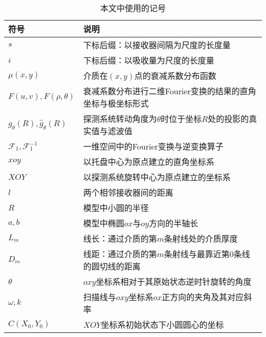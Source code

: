 \begin{table}[htbp]
\centering
\caption{本文中使用的记号}
\label{table:symbol}
\begin{tabular}{@{}ll@{}}
\toprule
符号          & 说明                           \\ \midrule
$s$         & 下标后缀：以接收器间隔为尺度的长度量           \\
$i$         & 下标后缀：以吸收量为尺度的长度量             \\
$\mu(x,y)$  & 介质在$(x,y)$点的衰减系数分布函数          \\
$F(u,v), F(\rho,\theta)$  & 衰减系数分布进行二维Fourier变换的结果的直角坐标与极坐标形式 \\
$g_\theta(R), \hat{g}_\theta(R)$ & 探测系统转动角度为$\theta$时位于坐标$R$处的投影的真实值与滤波值 \\
$\mathcal F_1, \mathcal F_1^{-1}$ & 一维空间中的Fourier变换与逆变换算子\\
$xoy$       & 以托盘中心为原点建立的直角坐标系             \\
$XOY$       & 以探测系统旋转中心为原点建立的坐标系           \\
$l$         & 两个相邻接收器间的距离                  \\
$R$         & 模型中小圆的半径                      \\
$a, b$      & 模型中椭圆$ox$与$oy$方向的半轴长         \\
$L_m$       & 线长：通过介质的第$m$条射线处的介质厚度        \\
$D_m$       & 线距：通过介质的第$m$条射线与最靠近第$0$条线的圆切线的距离    \\
$\theta$    & $oxy$坐标系相对于其原始状态逆时针旋转的角度     \\
$\omega, k$ & 扫描线与$oxy$坐标系$ox$正方向的夹角及其对应斜率 \\
$C(X_0,Y_0)$   & $XOY$坐标系初始状态下小圆圆心的坐标 \\ \bottomrule
\end{tabular}
\end{table} 